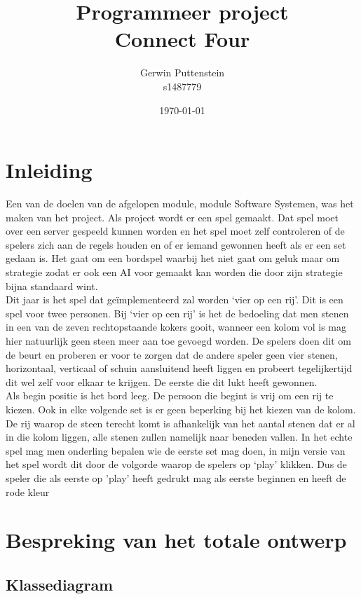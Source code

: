 \documentclass[12pt]{article}
\begin{document}
\title{Programmeer project\\Connect Four}
\author{Gerwin Puttenstein\\s1487779}
\date{\today}
\maketitle
\newpage
\tableofcontents
\newpage
\section{Inleiding}
Een van de doelen van de afgelopen module, module Software Systemen, was het maken van het project. Als project wordt er een spel gemaakt. Dat spel moet over een server gespeeld kunnen worden en het spel moet zelf controleren of de spelers zich aan de regels houden en of er iemand gewonnen heeft als er een set gedaan is. Het gaat om een bordspel waarbij het niet gaat om geluk maar om strategie zodat er ook een AI voor gemaakt kan worden die door zijn strategie bijna standaard wint.\\
Dit jaar is het spel dat ge\"implementeerd zal worden `vier op een rij'. Dit is een spel voor twee personen. Bij `vier op een rij' is het de bedoeling dat men stenen in een van de zeven rechtopstaande kokers gooit, wanneer een kolom vol is mag hier natuurlijk geen steen meer aan toe gevoegd worden. De spelers doen dit om de beurt en proberen er voor te zorgen dat de andere speler geen vier stenen, horizontaal, verticaal of schuin aansluitend heeft liggen en probeert tegelijkertijd dit wel zelf voor elkaar te krijgen. De eerste die dit lukt heeft gewonnen.\\
Als begin positie is het bord leeg. De persoon die begint is vrij om een rij te kiezen. Ook in elke volgende set is er geen beperking bij het kiezen van de kolom. De rij waarop de steen terecht komt is afhankelijk van het aantal stenen dat er al in die kolom liggen, alle stenen zullen namelijk naar beneden vallen. In het echte spel mag men onderling bepalen wie de eerste set mag doen, in mijn versie van het spel wordt dit door de volgorde waarop de spelers op `play' klikken. Dus de speler die als eerste op 'play' heeft gedrukt mag als eerste beginnen en heeft de rode kleur\\
\newpage 
\section{Bespreking van het totale ontwerp}
\subsection{Klassediagram}
\end{document}
